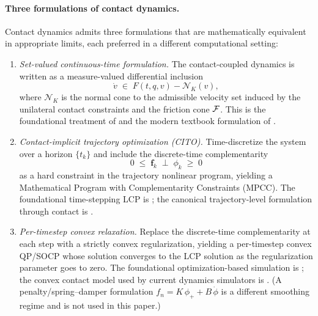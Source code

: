 \paragraph{Three formulations of contact dynamics.}
Contact dynamics admits three formulations that are mathematically
equivalent in appropriate limits, each preferred in a different
computational setting:
\begin{enumerate}[label=(\arabic*),leftmargin=*]
  \item \emph{Set-valued continuous-time formulation.} The
        contact-coupled dynamics is written as a measure-valued
        differential inclusion
        \[
          \dot v \;\in\; F(t, q, v) - \mathcal{N}_{K}(v),
        \]
        where $\mathcal{N}_{K}$ is the normal cone to the admissible
        velocity set induced by the unilateral contact constraints
        and the friction cone $\mathcal{F}$. This is the
        foundational treatment of \citet{Stewart2000} and the
        modern textbook formulation of \citet{Brogliato2016}.
  \item \emph{Contact-implicit trajectory optimization (CITO).}
        Time-discretize the system over a horizon $\{t_{k}\}$ and
        include the discrete-time complementarity
        \[
          0 \;\le\; \mathbf{f}_{k} \;\perp\; \phi_{k} \;\ge\; 0
        \]
        as a hard constraint in the trajectory nonlinear program,
        yielding a Mathematical Program with Complementarity
        Constraints (MPCC). The foundational time-stepping LCP is
        \citet{StewartTrinkle1996}; the canonical trajectory-level
        formulation through contact is
        \citet{PosaCantuTedrake2014}.
  \item \emph{Per-timestep convex relaxation.} Replace the
        discrete-time complementarity at each step with a strictly
        convex regularization, yielding a per-timestep convex
        QP/SOCP whose solution converges to the LCP solution as the
        regularization parameter goes to zero. The foundational
        optimization-based simulation is \citet{Anitescu2006}; the
        convex contact model used by current dynamics simulators is
        \citet{Todorov2014}. (A penalty/spring--damper formulation
        $f_{n} = K\, \phi_{+} + B\, \dot\phi$ is a different
        smoothing regime and is not used in this paper.)
\end{enumerate}

